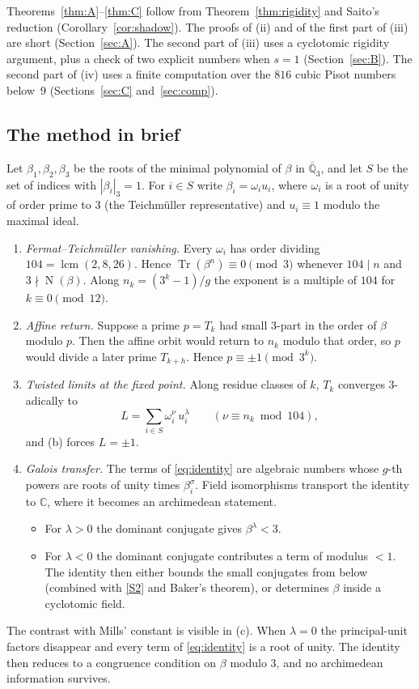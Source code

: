 \documentclass[11pt,a4paper]{article}
\theoremstyle{definition}
\theoremstyle{remark}
\newcommand{\C}{\mathbb{C}}
\newcommand{\Qtbar}{\overline{\mathbb{Q}}_3}
\DeclareMathOperator{\Tr}{Tr}
\DeclareMathOperator{\Nm}{N}
\begin{document}
Theorems~\ref{thm:A}--\ref{thm:C} follow from Theorem~\ref{thm:rigidity} and Saito's reduction (Corollary~\ref{cor:shadow}).
The proofs of (ii) and of the first part of (iii) are short (Section~\ref{sec:A}).
The second part of (iii) uses a cyclotomic rigidity argument, plus a check of two explicit numbers when $s=1$ (Section~\ref{sec:B}).
The second part of (iv) uses a finite computation over the $816$ cubic Pisot numbers below~$9$ (Sections~\ref{sec:C} and~\ref{sec:comp}).

\subsection{The method in brief}
Let $\beta_1,\beta_2,\beta_3$ be the roots of the minimal polynomial of $\beta$ in $\Qtbar$, and let $S$ be the set of indices with $|\beta_i|_3=1$.
For $i\in S$ write $\beta_i=\omega_iu_i$, where $\omega_i$ is a root of unity of order prime to $3$ (the Teichm\"uller representative) and $u_i\equiv1$ modulo the maximal ideal.
\begin{enumerate}[label=(\alph*)]
\item \emph{Fermat--Teichm\"uller vanishing.} Every $\omega_i$ has order dividing $104=\operatorname{lcm}(2,8,26)$. Hence $\Tr(\beta^n)\equiv0\pmod3$ whenever $104\mid n$ and $3\nmid\Nm(\beta)$. Along $n_k=(3^k-1)/g$ the exponent is a multiple of $104$ for $k\equiv0\pmod{12}$.
\item \emph{Affine return.} Suppose a prime $p=T_k$ had small $3$-part in the order of $\beta$ modulo $p$. Then the affine orbit would return to $n_k$ modulo that order, so $p$ would divide a later prime $T_{k+h}$. Hence $p\equiv\pm1\pmod{3^{k}}$.
\item \emph{Twisted limits at the fixed point.} Along residue classes of $k$, $T_k$ converges $3$-adically to
\begin{equation}\label{eq:identity}
 L=\sum_{i\in S}\omega_i^{\nu}\,u_i^{\lambda}\qquad(\nu\equiv n_k\bmod104),
\end{equation}
and (b) forces $L=\pm1$.
\item \emph{Galois transfer.} The terms of \eqref{eq:identity} are algebraic numbers whose $g$-th powers are roots of unity times $\beta_i^{\sigma}$. Field isomorphisms transport the identity to $\C$, where it becomes an archimedean statement.
\begin{itemize}
\item For $\lambda>0$ the dominant conjugate gives $\beta^{\lambda}<3$.
\item For $\lambda<0$ the dominant conjugate contributes a term of modulus $<1$. The identity then either bounds the small conjugates from below (combined with \ref{S2} and Baker's theorem), or determines $\beta$ inside a cyclotomic field.
\end{itemize}
\end{enumerate}
The contrast with Mills' constant is visible in (c).
When $\lambda=0$ the principal-unit factors disappear and every term of \eqref{eq:identity} is a root of unity.
The identity then reduces to a congruence condition on $\beta$ modulo $3$, and no archimedean information survives.
\end{document}
